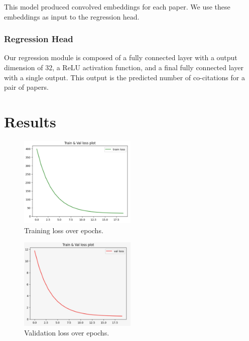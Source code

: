 \documentclass[10pt,twocolumn,letterpaper]{article}
\begin{document}
This model produced convolved embeddings for each paper. We use these embeddings as input to the regression head.

\subsubsection{Regression Head}

Our regression module is composed of a fully connected layer with a output dimension of 32, a ReLU activation function, and a final fully connected layer with a single output. This output is the predicted number of co-citations for a pair of papers.


\section{Results}


\begin{figure}
      \centering
      \includegraphics[width=0.5\textwidth]{figures/train-loss.jpeg}
      \caption{Training loss over epochs.}
      \label{fig:train_loss}
\end{figure}

\begin{figure}
   \centering
   \includegraphics[width=0.5\textwidth]{figures/val-loss.jpeg}
   \caption{Validation loss over epochs.}
   \label{fig:val_loss}
\end{figure}
\end{document}
